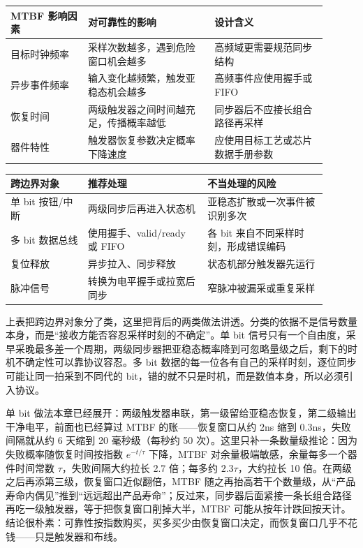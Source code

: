 \begin{longtable}{L{0.22\linewidth}L{0.36\linewidth}L{0.32\linewidth}}
\toprule
MTBF 影响因素 & 对可靠性的影响 & 设计含义 \\
\midrule
目标时钟频率 & 采样次数越多，遇到危险窗口机会越多 & 高频域更需要规范同步结构 \\\tablerowrule
异步事件频率 & 输入变化越频繁，触发亚稳态机会越多 & 高频事件应使用握手或 FIFO \\\tablerowrule
恢复时间 & 两级触发器之间时间越充足，传播概率越低 & 同步器后不应接长组合路径再采样 \\\tablerowrule
器件特性 & 触发器恢复参数决定概率下降速度 & 应使用目标工艺或芯片数据手册参数 \\
\bottomrule
\end{longtable}
\vspace{0.8em plus 0.25em}

\begin{longtable}{L{0.22\linewidth}L{0.34\linewidth}L{0.34\linewidth}}
\toprule
跨边界对象 & 推荐处理 & 不当处理的风险 \\
\midrule
单 bit 按钮/中断 & 两级同步后再进入状态机 & 亚稳态扩散或一次事件被识别多次 \\\tablerowrule
多 bit 数据总线 & 使用握手、valid/ready 或 FIFO & 各 bit 来自不同采样时刻，形成错误编码 \\\tablerowrule
复位释放 & 异步拉入、同步释放 & 状态机部分触发器先运行 \\\tablerowrule
脉冲信号 & 转换为电平握手或拉宽后同步 & 窄脉冲被漏采或重复采样 \\
\bottomrule
\end{longtable}
\vspace{0.8em plus 0.25em}


上表把跨边界对象分了类，这里把背后的两类做法讲透。分类的依据不是信号数量本身，而是“接收方能否容忍采样时刻的不确定”。单 bit 信号只有一个自由度，采早采晚最多差一个周期，两级同步器把亚稳态概率降到可忽略量级之后，剩下的时机不确定性可以靠协议容忍。多 bit 数据的每一位各有自己的采样时刻，逐位同步可能让同一拍采到不同代的 bit，错的就不只是时机，而是数值本身，所以必须引入协议。

单 bit 做法本章已经展开：两级触发器串联，第一级留给亚稳态恢复，第二级输出干净电平，前面也已经算过 MTBF 的账——恢复窗口从约 2ns 缩到 0.3ns，失败间隔就从约 6 天缩到 20 毫秒级（每秒约 50 次）。这里只补一条数量级推论：因为失败概率随恢复时间按指数 $e^{-t/\tau}$ 下降，MTBF 对余量极端敏感，余量每多一个器件时间常数 $\tau$，失败间隔大约拉长 2.7 倍；每多约 $2.3\tau$，大约拉长 10 倍。在两级之后再添第三级，恢复窗口近似翻倍，MTBF 随之再抬高若干个数量级，从“产品寿命内偶见”推到“远远超出产品寿命”；反过来，同步器后面紧接一条长组合路径再吃一级触发器，等于把恢复窗口削掉大半，MTBF 可能从按年计跌回按天计。结论很朴素：可靠性按指数购买，买多买少由恢复窗口决定，而恢复窗口几乎不花钱——只是触发器和布线。

